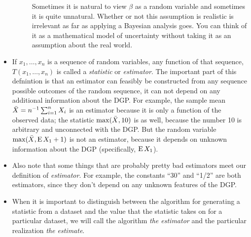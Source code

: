 \begin{itemize}
\begin{description}
    Sometimes it is natural to view $\beta$ as a random variable and
    sometimes it is quite unnatural.  Whether or not this assumption
    is realistic is irrelevant as far as applying a Bayesian analysis
    goes.  You can think of it as a mathematical model of uncertainty
    without taking it as an assumption about the real world.
  \end{description}
  
\item If $x_1,\dots,x_n$ is a sequence of random variables, any function of
  that sequence, $T(x_1,\dots,x_n)$ is called a \emph{statistic} or
  \emph{estimator}.  The important part of this defnintion is that an
  estimator can feasibly be constructed from any sequence possible
  outcomes of the random sequence, it can not depend on any additional
  information about the DGP.  For example, the sample mean $\bar{X} =
  n^{-1} \sum_{i=1}^n X_i$ is an estimator because it is only a function
  of the observed data; the statistic $\max(\bar{X}, 10)$ is as well,
  because the number 10 is arbitrary and unconnected with the DGP.
  But the random variable $\max(\bar{X}, \operatorname{E} X_1 + 1)$ is not an estimator,
  because it depends on unknown information about the DGP
  (specifically, $\operatorname{E} X_1$).

\item Also note that some things that are probably pretty bad
  estimators meet our definition of \emph{estimator}.  For example,
  the constants ``30'' and ``1/2'' are both estimators, since they
  don't depend on any unknown features of the DGP.

\item When it is important to distinguish between the algorithm for
  generating a statistic from a dataset and the value that the
  statistic takes on for a particular dataset, we will call the
  algorithm \emph{the estimator} and the particular realization
  \emph{the estimate}.

\end{itemize}

